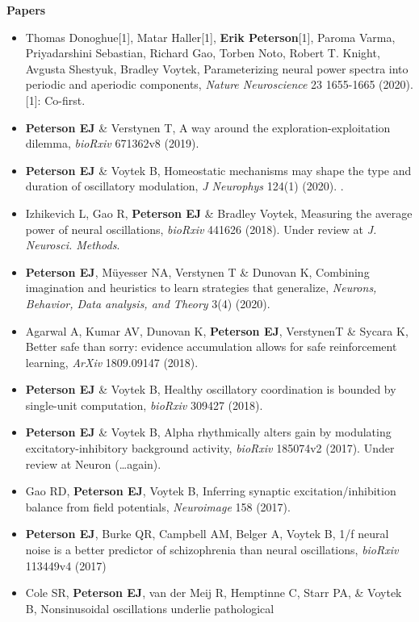 \textbf{Papers}

\begin{itemize}
\item
  Thomas Donoghue{[}1{]}, Matar Haller{[}1{]}, \textbf{Erik
  Peterson}{[}1{]}, Paroma Varma, Priyadarshini Sebastian, Richard Gao,
  Torben Noto, Robert T. Knight, Avgusta Shestyuk, Bradley Voytek,
  Parameterizing neural power spectra into periodic and aperiodic
  components, \emph{Nature Neuroscience} 23 1655-1665 (2020). {[}1{]}:
  Co-first.
\item
  \textbf{Peterson EJ} \& Verstynen T, A way around the
  exploration-exploitation dilemma, \emph{bioRxiv} 671362v8 (2019).
\item
  \textbf{Peterson EJ} \& Voytek B, Homeostatic mechanisms may shape the
  type and duration of oscillatory modulation, \emph{J Neurophys} 124(1)
  (2020). .
\item
  Izhikevich L, Gao R, \textbf{Peterson EJ} \& Bradley Voytek, Measuring
  the average power of neural oscillations, \emph{bioRxiv} 441626
  (2018). Under review at \emph{J. Neurosci. Methods}.
\item
  \textbf{Peterson EJ}, Müyesser NA, Verstynen T \& Dunovan K, Combining
  imagination and heuristics to learn strategies that generalize,
  \emph{Neurons, Behavior, Data analysis, and Theory} 3(4) (2020).
\item
  Agarwal A, Kumar AV, Dunovan K, \textbf{Peterson EJ}, VerstynenT \&
  Sycara K, Better safe than sorry: evidence accumulation allows for
  safe reinforcement learning, \emph{ArXiv} 1809.09147 (2018).
\item
  \textbf{Peterson EJ} \& Voytek B, Healthy oscillatory coordination is
  bounded by single-unit computation, \emph{bioRxiv} 309427 (2018).
\item
  \textbf{Peterson EJ} \& Voytek B, Alpha rhythmically alters gain by
  modulating excitatory-inhibitory background activity, \emph{bioRxiv}
  185074v2 (2017). Under review at Neuron (\ldots{}again).
\item
  Gao RD, \textbf{Peterson EJ}, Voytek B, Inferring synaptic
  excitation/inhibition balance from field potentials, \emph{Neuroimage}
  158 (2017).
\item
  \textbf{Peterson EJ}, Burke QR, Campbell AM, Belger A, Voytek B, 1/f
  neural noise is a better predictor of schizophrenia than neural
  oscillations, \emph{bioRxiv} 113449v4 (2017)
\item
  Cole SR, \textbf{Peterson EJ}, van der Meij R, Hemptinne C, Starr PA,
  \& Voytek B, Nonsinusoidal oscillations underlie pathological

\end{itemize}
